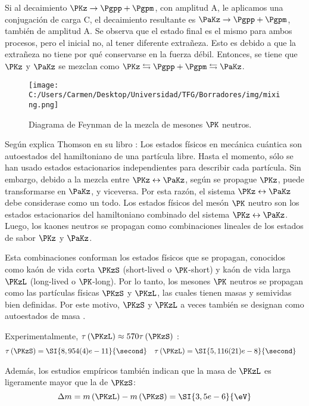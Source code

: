 Si al decaimiento $\PKz \rightarrow \Pgpp + \Pgpm$, con amplitud A, le aplicamos una conjugación de carga C, el decaimiento resultante es $\PaKz \rightarrow \Pgpp + \Pgpm$, también de amplitud A. Se observa que el estado final es el mismo para ambos procesos, pero el inicial no, al tener diferente extrañeza. Esto es debido a que la extrañeza no tiene por qué conservarse en la fuerza débil. Entonces, se tiene que $\PKz$ y $\PaKz$ se mezclan como $\PKz \leftrightarrows \Pgpp + \Pgpm \leftrightarrows \PaKz$.

\begin{figure}[!ht]
	\centering
	\texttt{[image: C:/Users/Carmen/Desktop/Universidad/TFG/Borradores/img/mixing.png]}
	\caption[Diagrama de Feynmann de la mezcla de mesones $\PK$ neutros]
	{Diagrama de Feynman de la mezcla de mesones $\PK$ neutros. \cite{Thomson}}
	\label{fig:kaonmix}
\end{figure}

Según explica Thomson en su libro \cite{Thomson}: Los estados físicos en mecánica cuántica son autoestados del hamiltoniano de una partícula libre. Hasta el momento, sólo se han usado estados estacionarios independientes para describir cada partícula. Sin embargo, debido a la mezcla entre $\PKz \leftrightarrow \PaKz$, según se propague $\PKz$, puede transformarse en $\PaKz$, y viceversa. Por esta razón, el sistema $\PKz \leftrightarrow \PaKz$ debe considerase como un todo. Los estados físicos del mesón $\PK$ neutro son los estados estacionarios del hamiltoniano combinado del sistema $\PKz \leftrightarrow \PaKz$. Luego, los kaones neutros se propagan como combinaciones lineales de los estados de sabor $\PKz$ y $\PaKz$. 

Esta combinaciones conforman los estados físicos que se propagan, conocidos como kaón de vida corta $\PKzS$ (short-lived o $\PK$-short) y kaón de vida larga $\PKzL$ (long-lived o $\PK$-long). Por lo tanto, los mesones $\PK$ neutros se propagan como las partículas físicas $\PKzS$ y $\PKzL$, las cuales tienen masas y semividas bien definidas. Por este motivo, $\PKzS$ y $\PKzL$ a veces también se designan como autoestados de masa \cite{Perkins}.

Experimentalmente, $\tau\left(\PKzL\right) \approx 570\tau\left(\PKzS\right)$ \cite{Zyla}:
\begin{align}
\tau\left(\PKzS\right) &= \SI{8,954(4)e-11}{\second} & \tau\left(\PKzL\right) &= \SI{5,116(21)e-8}{\second}
\end{align}

Además, los estudios empíricos también indican que la masa de $\PKzL$ es ligeramente mayor que la de $\PKzS$: 
\begin{equation}
\Delta m= m\left(\PKzL\right)-m\left(\PKzS\right)=\SI{3,5e-6}{\eV}
\end{equation}

